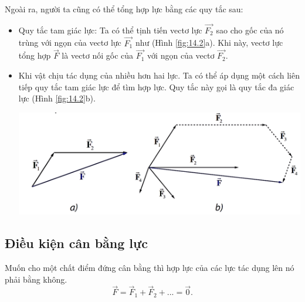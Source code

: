 Ngoài ra, người ta cũng có thể tổng hợp lực bằng các quy tắc sau:
\begin{itemize}
	\item Quy tắc tam giác lực: Ta có thể tịnh tiến vectơ lực $\overrightarrow{F_2}$ sao cho gốc của nó trùng với ngọn của vectơ lực $\overrightarrow{F_1}$ như (Hình \ref{fig:14.2}a). Khi này, vectơ lực tổng hợp $\vec{F}$ là vectơ nối gốc của $\overrightarrow{F_1}$ với ngọn của vectơ $\overrightarrow{F_2}$.
	\item Khi vật chịu tác dụng của nhiều hơn hai lực. Ta có thể áp dụng một cách liên tiếp quy tắc tam giác lực để tìm hợp lực. Quy tắc này gọi là quy tắc đa giác lực (Hình \ref{fig:14.2}b).
	\begin{center}
		\includegraphics[width=0.7\linewidth]{../figs/VN10-2023-PH-TP014-2}
		\label{fig:14.2}
	\end{center}
\end{itemize}
\subsection{Điều kiện cân bằng lực}
Muốn cho một chất điểm đứng cân bằng thì hợp lực của các lực tác dụng lên nó phải bằng không.
$$\vec{F}=\vec{F}_1+\vec{F}_2+...=\vec{0}.$$
